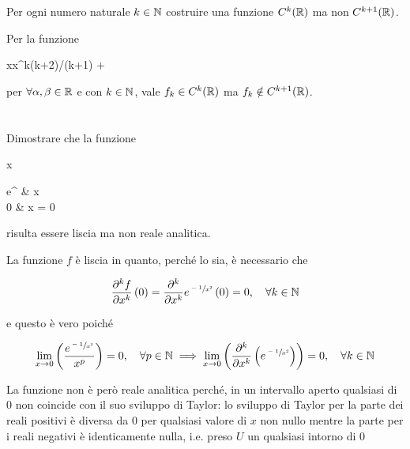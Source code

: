 \section{}\label{es1-1}

\begin{tcolorbox}
	Per ogni numero naturale $ k \in \mathbb{N} $ costruire una funzione $ C^{k}(\mathbb{R}) $ ma non $ C^{k+1}(\mathbb{R}) $.
\end{tcolorbox}

Per la funzione

	{\R}{\R}
	{x}{\alpha x^{k(k+2)/(k+1)} + \beta}

per $ \forall \alpha,\beta \in \mathbb{R} $ e con $ k \in \mathbb{N} $, vale $ f_{k} \in C^{k}(\mathbb{R}) $ ma $ f_{k} \notin C^{k+1}(\mathbb{R}) $.

%

\newpage

%

\section{}\label{es1-2}

\begin{tcolorbox}
	Dimostrare che la funzione
	
		{\R}{\R}
		{x}{%
			\begin{cases}
				e^{} & x \\
				0 & x = 0
			\end{cases}
			}
	
	risulta essere liscia ma non reale analitica.
\end{tcolorbox}

La funzione $ f $ è liscia in quanto, perché lo sia, è necessario che

\begin{equation}
	\pdv[k]{f}{x} \, (0) = \pdv[k]{x} e^{\sfrac{-1}{x^{2}}} \, (0) = 0 \qcomma \forall k \in \N
\end{equation}

e questo è vero poiché

\begin{equation}
	\lim_{x \to 0} \left( \dfrac{e^{\sfrac{-1}{x^{2}}}}{x^{p}} \right) = 0 \qcomma \forall p \in \N %
	\implies%
	\lim_{x \to 0} \left( \pdv[k]{x} \left( e^{\sfrac{-1}{x^{2}}} \right) \right) = 0 \qcomma \forall k \in \N
\end{equation}

La funzione non è però reale analitica perché, in un intervallo aperto qualsiasi di 0 non coincide con il suo sviluppo di Taylor: lo sviluppo di Taylor per la parte dei reali positivi è diversa da 0 per qualsiasi valore di $ x $ non nullo mentre la parte per i reali negativi è identicamente nulla, i.e. preso $ U $ un qualsiasi intorno di 0


